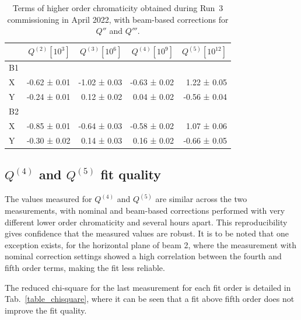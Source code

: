 \begin{table}[tbh]
    \centering
    \small
    \setlength{\tabcolsep}{4.2pt}
    \begin{tabular}{|l||r|r|r|r|}
    \hline
                 & $Q^{(2)} [10^3]$ & $Q^{(3)} [10^6]$ & $Q^{(4)} [10^9]$ & $Q^{(5)} [10^{12}]$ \\ \hline\hline
        B1    &           &          &              &              \\
        X         & -0.62 ± 0.01     & -1.02 ± 0.03 & -0.63 ± 0.02 &  1.22 ± 0.05 \\
        Y         & -0.24 ± 0.01     & 0.12 ± 0.02 &  0.04 ± 0.02 & -0.56 ± 0.04 \\ \hline
        B2    &           &          &              &              \\
        X         & -0.85 ± 0.01     & -0.64 ± 0.03 & -0.58 ± 0.02 &  1.07 ± 0.06 \\
        Y         & -0.30 ± 0.02     & 0.14 ± 0.03 &  0.16 ± 0.02 & -0.66 ± 0.05 \\ \hline
    \end{tabular}
    \caption{Terms of higher order chromaticity obtained during Run~3 commissioning in April 2022, with beam-based corrections for $Q''$ and $Q'''$.}
    \label{chroma_table_after}
\end{table}


\subsection{\texorpdfstring{$Q^{(4)}$ and $Q^{(5)}$}{Q4 and Q5} fit quality}
\label{subsection:q4q5_quality}

The values measured for $Q^{(4)}$ and $Q^{(5)}$ are similar across the two measurements, with nominal and beam-based corrections performed with very different lower order chromaticity and several hours apart.
This reproducibility gives confidence that the measured values are robust.
It is to be noted that one exception exists, for the horizontal plane of beam 2, where the measurement with nominal correction settings showed a high correlation between the fourth and fifth order terms, making the fit less reliable.

The reduced chi-square for the last measurement for each fit order is detailed in Tab.~\ref{table_chisquare}, where it can be seen that a fit above fifth order does not improve the fit quality.

